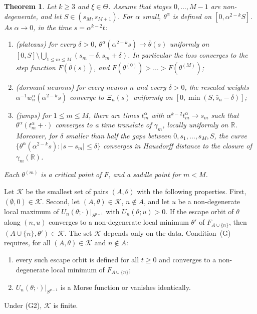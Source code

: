 \documentclass[11pt]{article}
\newtheorem{maintheorem}{Theorem}
\theoremstyle{definition}
\theoremstyle{remark}
\newcommand{\R}{\mathbb{R}}
\newcommand{\cK}{\mathcal{K}}
\newcommand{\sm}{\setminus}
\begin{document}
\begin{maintheorem}\label{thm:main}
Let $k\ge3$ and $\xi\in\Theta$. Assume that stages $0,\dots,M-1$ are non-degenerate, and let $S\in(s_M,s_{M+1})$. For $\alpha$ small, $\theta^\alpha$ is defined on $[0,\alpha^{2-k}S]$. As $\alpha\to0$, in the time $s=\alpha^{k-2}t$:
\begin{enumerate}[label=\textup{(\roman*)},nosep]
\item \emph{(plateaus)} for every $\delta>0$, $\theta^\alpha(\alpha^{2-k}s)\to\bar\theta(s)$ uniformly on $[0,S]\sm\bigcup_{1\le m\le M}(s_m-\delta,s_m+\delta)$. In particular the loss converges to the step function $F(\bar\theta(s))$, and $F(\theta^{(0)})>\dots>F(\theta^{(M)})$;
\item \emph{(dormant neurons)} for every neuron $n$ and every $\delta>0$, the rescaled weights $\alpha^{-1}w^\alpha_n(\alpha^{2-k}s)$ converge to $\Xi_n(s)$ uniformly on $[0,\min(S,\bar s_n-\delta)]$;
\item \emph{(jumps)} for $1\le m\le M$, there are times $t^\alpha_m$ with $\alpha^{k-2}t^\alpha_m\to s_m$ such that $\theta^\alpha(t^\alpha_m+\cdot)$ converges to a time translate of $\gamma_m$, locally uniformly on $\R$. Moreover, for $\delta$ smaller than half the gaps between $0,s_1,\dots,s_M,S$, the curve $\{\theta^\alpha(\alpha^{2-k}s):|s-s_m|\le\delta\}$ converges in Hausdorff distance to the closure of $\gamma_m(\R)$.
\end{enumerate}
Each $\theta^{(m)}$ is a critical point of $F$, and a saddle point for $m<M$.
\end{maintheorem}

Let $\cK$ be the smallest set of pairs $(A,\theta)$ with the following properties. First, $(\emptyset,0)\in\cK$. Second, let $(A,\theta)\in\cK$, $n\notin A$, and let $u$ be a non-degenerate local maximum of $U_n(\theta;\cdot)|_{S^{p-1}}$ with $U_n(\theta;u)>0$. If the escape orbit of $\theta$ along $(n,u)$ converges to a non-degenerate local minimum $\theta'$ of $F_{A\cup\{n\}}$, then $(A\cup\{n\},\theta')\in\cK$. The set $\cK$ depends only on the data. Condition~(G) requires, for all $(A,\theta)\in\cK$ and $n\notin A$:
\begin{enumerate}[label=\textup{(G\arabic*)},leftmargin=4em,nosep]
\item every such escape orbit is defined for all $t\ge0$ and converges to a non-degenerate local minimum of $F_{A\cup\{n\}}$;
\item $U_n(\theta;\cdot)|_{S^{p-1}}$ is a Morse function or vanishes identically.
\end{enumerate}
Under (G2), $\cK$ is finite.
\end{document}
